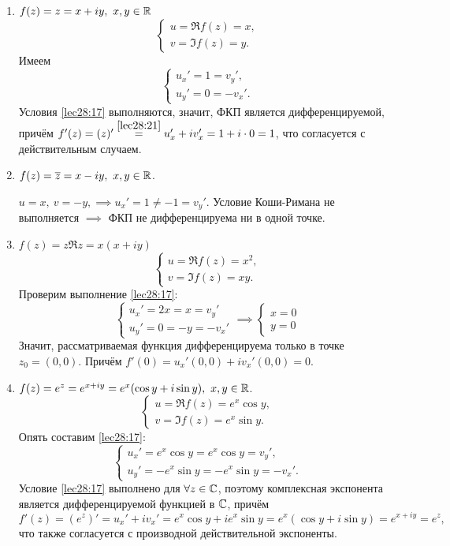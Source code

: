 \documentclass[../../main.tex]{subfiles}
\begin{document}
\begin{exmps}

\;

\begin{enumerate}
	\item $ f(z) = z = x + iy,\ x, y \in \mathbb{R} $
	\[
	\begin{cases}
		u = \Re f(z) = x,\\
		v = \Im f(z) = y.
	\end{cases}
	\]
	Имеем 
	\[
	\begin{cases}
		u_x' = 1 = v_y',\\
		u_y' = 0 = -v_x'.
	\end{cases}
	\]
	Условия \eqref{lec28:17} выполняются, значит, ФКП является дифференцируемой,
	причём $ f'(z) = (z)' \stackrel{\eqref{lec28:21}}{=} u_x' + iv_x' = 
	1 + i\cdot0 = 1 $, что согласуется с действительным случаем.
	\item $ f(z) = \overline{z} = x - iy,\ x, y \in \mathbb{R} $.
	
	$ u = x,\ v = -y, \implies u_x' = 1 \neq -1 = v_y' $. 
	Условие Коши-Римана не выполняется $ \implies $ ФКП 
	не дифференцируема ни в одной точке.
	\item $ f(z) = z \Re z = x(x + iy) $
	\[
	\begin{cases}
		u = \Re f(z) = x^2,\\
		v = \Im f(z) = xy.
	\end{cases}
	\]
	Проверим выполнение \eqref{lec28:17}:
	\[
	\begin{cases}
		u_x' = 2x = x = v_y'\\
		u_y' = 0 = -y = -v_x'
	\end{cases} \implies
	\begin{cases}
		x = 0\\
		y = 0
	\end{cases}
	\]
	Значит, рассматриваемая функция дифференцируема только в точке
	$ z_0 = (0, 0) $. Причём
	$ f'(0) = u_x'(0, 0) + iv_x'(0, 0) = 0 $.
	\item $ f(z) = e^z = e^{x + iy} = e^x(\cos y + i\sin y),\ x, y \in \mathbb{R} $.
	\[
	\begin{cases}
		u = \Re f(z) = e^x \cos y,\\
		v = \Im f(z) = e^x \sin y.
	\end{cases}
	\]
	Опять составим \eqref{lec28:17}:
	\[
	\begin{cases}
	u_x' = e^x \cos y = e^x \cos y = v_y',\\
	u_y' = -e^x \sin y = -e^x \sin y = -v_x'.
	\end{cases}
	\]
	Условие \eqref{lec28:17} выполнено для $ \forall z \in \mathbb{C} $, 
	поэтому комплексная экспонента является дифференцируемой функцией в $ \mathbb{C} 
	$, причём
	\[
	f'(z) = (e^z)' = u_x' + iv_x' = e^x \cos y + ie^x \sin y =
	e^x(\cos y + i\sin y) = e^{x + iy} = e^z,
	\]
	что также согласуется с производной действительной экспоненты.
\end{enumerate}
\end{exmps}
\end{document}
